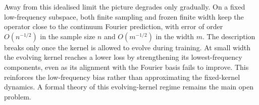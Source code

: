 Away from this idealised limit the picture degrades only gradually. On a fixed
low-frequency subspace, both finite sampling and frozen finite width keep the
operator close to the continuum Fourier prediction, with error of order
\(O(n^{-1/2})\) in the sample size \(n\) and \(O(m^{-1/2})\) in the width \(m\).
The description breaks only once the kernel is allowed to evolve during training.
At small width the evolving kernel reaches a lower loss by strengthening its
lowest-frequency components, even as its alignment with the Fourier basis fails
to improve. This reinforces the low-frequency bias rather than approximating the
fixed-kernel dynamics. A formal theory of this evolving-kernel regime remains the
main open problem.
